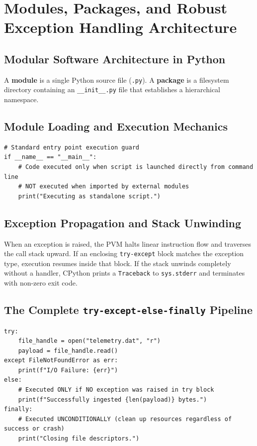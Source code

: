 \chapter{Modules, Packages, and Robust Exception Handling Architecture}
\label{chap:modules-exceptions}

\section{Modular Software Architecture in Python}
A \textbf{module} is a single Python source file (\texttt{.py}). A \textbf{package} is a filesystem directory containing an \texttt{\_\_init\_\_.py} file that establishes a hierarchical namespace.

\section{Module Loading and Execution Mechanics}
\begin{lstlisting}
# Standard entry point execution guard
if __name__ == "__main__":
    # Code executed only when script is launched directly from command line
    # NOT executed when imported by external modules
    print("Executing as standalone script.")
\end{lstlisting}

\section{Exception Propagation and Stack Unwinding}
\begin{definition}
When an exception is raised, the PVM halts linear instruction flow and traverses the call stack upward. If an enclosing \texttt{try-except} block matches the exception type, execution resumes inside that block. If the stack unwinds completely without a handler, CPython prints a \texttt{Traceback} to \texttt{sys.stderr} and terminates with non-zero exit code.
\end{definition}

\section{The Complete \texttt{try-except-else-finally} Pipeline}
\begin{lstlisting}
try:
    file_handle = open("telemetry.dat", "r")
    payload = file_handle.read()
except FileNotFoundError as err:
    print(f"I/O Failure: {err}")
else:
    # Executed ONLY if NO exception was raised in try block
    print(f"Successfully ingested {len(payload)} bytes.")
finally:
    # Executed UNCONDITIONALLY (clean up resources regardless of success or crash)
    print("Closing file descriptors.")
\end{lstlisting}

